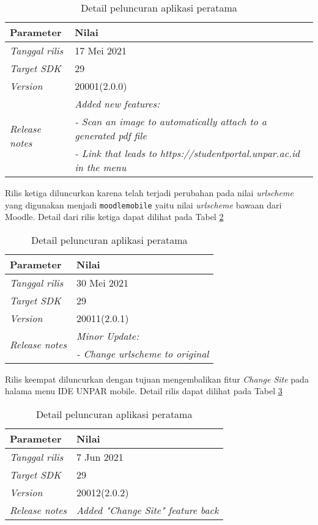 \begin{table}[H]
\caption{Detail peluncuran aplikasi peratama}
\centering
\begin{tabular}{|l | l |}
\hline
\textbf{Parameter} & \textbf{Nilai} \\  \hline
\textit{Tanggal rilis}  &  17  Mei 2021 \\ \hline
\textit{Target SDK} & 29 \\ \hline
\textit{Version} &  20001(2.0.0) \\ \hline
\multirow{3}{*}{\textit{Release notes}} &  \textit{Added new features:} \\ & \textit{- Scan an image to automatically attach to a generated pdf file}\\ &  \textit{- Link that leads to https://studentportal.unpar.ac.id in the menu} \\ 
\hline
\end{tabular}
\label{app:release:second}
\end{table}

Rilis ketiga diluncurkan karena telah terjadi perubahan pada nilai \textit{urlscheme} yang digunakan menjadi \texttt{moodlemobile} yaitu nilai \textit{urlscheme} bawaan dari Moodle. Detail dari rilis ketiga dapat dilihat pada Tabel \ref{app:release:third}

\begin{table}[H]
\caption{Detail peluncuran aplikasi peratama}
\centering
\begin{tabular}{|l | l |}
\hline
\textbf{Parameter} & \textbf{Nilai} \\  \hline
\textit{Tanggal rilis}  &  30  Mei 2021 \\ \hline
\textit{Target SDK} & 29 \\ \hline
\textit{Version} &  20011(2.0.1) \\ \hline
\multirow{2}{*}{\textit{Release notes}} &  \textit{Minor Update:} \\ & \textit{- Change urlscheme to original} \\ 
\hline
\end{tabular}
\label{app:release:third}
\end{table}

Rilis keempat diluncurkan dengan tujuan mengembalikan fitur \textit{Change Site} pada halama menu IDE UNPAR mobile. Detail rilis dapat dilihat pada Tabel \ref{app:release:fourth}

\begin{table}[H]
\caption{Detail peluncuran aplikasi peratama}
\centering
\begin{tabular}{|l | l |}
\hline
\textbf{Parameter} & \textbf{Nilai} \\  \hline
\textit{Tanggal rilis}  &  7  Jun 2021 \\ \hline
\textit{Target SDK} & 29 \\ \hline
\textit{Version} &  20012(2.0.2) \\ \hline
\textit{Release notes} &  \textit{Added "Change Site" feature back}  \\ 
\hline
\end{tabular}
\label{app:release:fourth}
\end{table}



